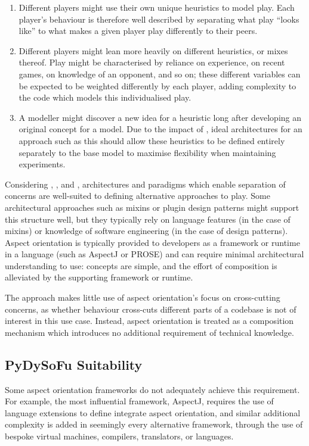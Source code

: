 \begin{enumerate}
    \item Different players might use their own unique heuristics to model play.
    Each player's behaviour is therefore well described by separating what play
    ``looks like'' to what makes a given player play differently to their peers.
    \item Different players might lean more heavily on different heuristics, or
    mixes thereof. Play might be characterised by reliance on experience, on
    recent games, on knowledge of an opponent, and so on; these different
    variables can be expected to be weighted differently by each player, adding
    complexity to the code which models this individualised play.
    \item A modeller might discover a new idea for a heuristic long after
    developing an original concept for a model. Due
    to the impact of , ideal architectures for an approach such as
    this should allow these heuristics to be defined entirely separately to
    the base model to maximise flexibility when maintaining experiments.
\end{enumerate}

Considering , , and , architectures and
paradigms which enable separation of concerns are well-suited to defining
alternative approaches to play. Some architectural approaches such as mixins or
plugin design patterns might support this structure well, but they typically
rely on language features (in the case of mixins) or knowledge of software
engineering (in the case of design patterns). Aspect orientation is typically
provided to developers as a framework or runtime in a language (such as
AspectJ\cite{aspectj_intro} or PROSE\cite{popovici2002PROSE}) and can require
minimal architectural understanding to use: concepts are simple, and the effort
of composition is alleviated by the supporting framework or runtime.

The approach makes little use of aspect orientation's focus on cross-cutting
concerns, as whether behaviour cross-cuts different parts of a codebase is not
of interest in this use case. Instead, aspect orientation is treated as a
composition mechanism which introduces no additional requirement of technical
knowledge.

\subsection{PyDySoFu Suitability}\label{subsec:optimisation_with_aspects_usingpdsf}
Some aspect orientation frameworks do not adequately achieve this requirement.
For example, the most influential framework, AspectJ, requires the use of
language extensions to define integrate aspect
orientation\cite{AspectJLanguageAndTools}, and similar additional complexity is
added in seemingly every alternative framework, through the use of bespoke
virtual machines, compilers, translators, or
languages\cite{rajan2006nu_towardsAO_invocation,popovici2003JITaspects,AspectCplusplusDesignImpl,baker2002maya}.

